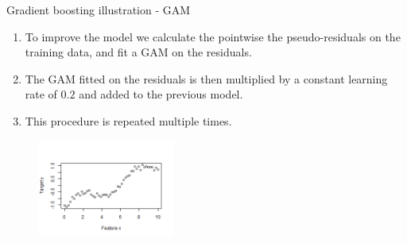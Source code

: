 \begin{vbframe}{Gradient boosting illustration - GAM}
\begin{enumerate}
  \item
    To improve the model we calculate the pointwise the pseudo-residuals on the training data, and fit a GAM on the residuals.

  \item
    The GAM fitted on the residuals is then multiplied by a constant learning rate of $0.2$ and added to the previous model.

  \item
    This procedure is repeated multiple times.

\end{enumerate}

\vspace{-0.3cm}
\begin{figure}
  \includegraphics[width=0.4\textwidth]{figure_man/illustration_data_normal_scaled.png}
\end{figure}


\end{vbframe}

